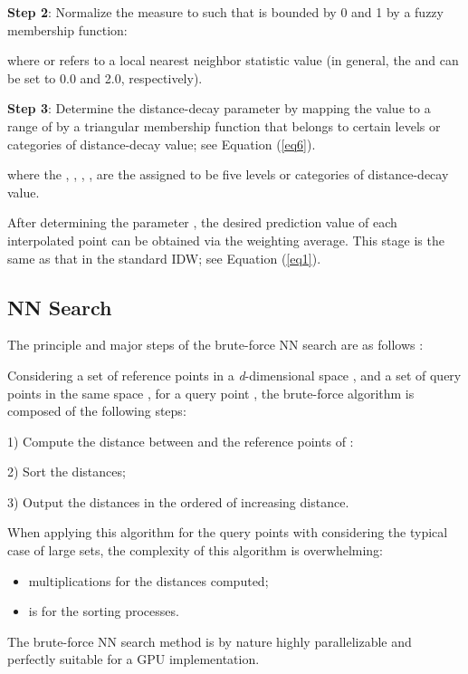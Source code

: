 \documentclass[final,5p,times,twocolumn,authoryear]{elsarticle}
\begin{document}
\textbf{Step 2}: Normalize the  measure to  
such that  is bounded by 0 and 1 by a fuzzy membership function: 

	where  or  refers to a local nearest neighbor 
	statistic value (in general, the  and  can 
	be set to 0.0 and 2.0, respectively).
	
	\textbf{Step 3}: Determine the distance-decay parameter  by mapping 
	the  value to a range of  by a triangular 
	membership function that belongs to certain levels or categories of 
	distance-decay value; see Equation (\ref{eq6}).

			where the , , , ,  are the assigned to be five levels or categories of 
			distance-decay value.
			
			After determining the parameter , the desired prediction value of 
			each interpolated point can be obtained via the weighting average. This 
			stage is the same as that in the standard IDW; see Equation (\ref{eq1}).
			
			\subsection{NN Search}
			The principle and major steps of the brute-force NN search are as follows \citep{n02DBLP:conf/cvpr/GarciaDB08}:
			
			Considering a set  of  reference points in a \textit{d}-dimensional 
			space , and a set  of  query points in the 
			same space , for a query point 
			, the brute-force algorithm is composed of the following steps:
			
			1) Compute the distance between  and the  reference points of :
			
			2) Sort the  distances;
			
			3) Output the distances in the ordered of increasing distance.
			
			When applying this algorithm for the  query points with considering the typical 
			case of large sets, the complexity of this algorithm is overwhelming:
			
			\begin{itemize}
				\item  multiplications for the  distances computed;
				\item  is for the  sorting processes.
			\end{itemize}
			
			The brute-force NN search method is by nature highly parallelizable and 
			perfectly suitable for a GPU implementation.
			
\end{document}
